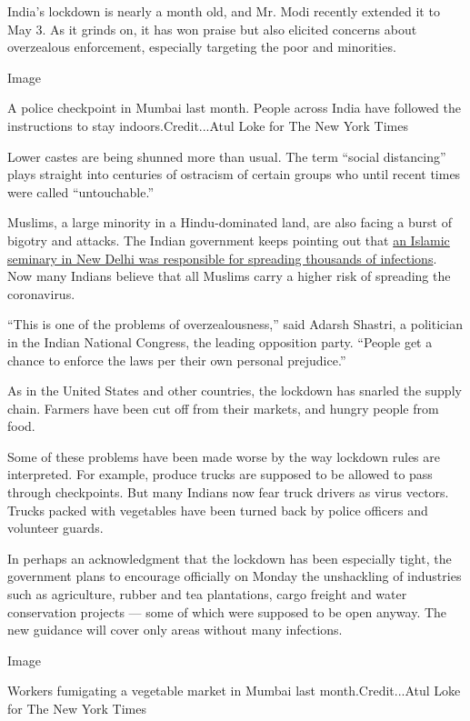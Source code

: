 India's lockdown is nearly a month old, and Mr. Modi recently extended
it to May 3. As it grinds on, it has won praise but also elicited
concerns about overzealous enforcement, especially targeting the poor
and minorities.

Image

A police checkpoint in Mumbai last month. People across India have
followed the instructions to stay indoors.Credit...Atul Loke for The New
York Times

Lower castes are being shunned more than usual. The term ``social
distancing'' plays straight into centuries of ostracism of certain
groups who until recent times were called ``untouchable.''

Muslims, a large minority in a Hindu-dominated land, are also facing a
burst of bigotry and attacks. The Indian government keeps pointing out
that
\href{https://www.nytimes.com/2020/04/12/world/asia/india-coronavirus-muslims-bigotry.html}{an
Islamic seminary in New Delhi was responsible for spreading thousands of
infections}. Now many Indians believe that all Muslims carry a higher
risk of spreading the coronavirus.

``This is one of the problems of overzealousness,'' said Adarsh Shastri,
a politician in the Indian National Congress, the leading opposition
party. ``People get a chance to enforce the laws per their own personal
prejudice.''

As in the United States and other countries, the lockdown has snarled
the supply chain. Farmers have been cut off from their markets, and
hungry people from food.

Some of these problems have been made worse by the way lockdown rules
are interpreted. For example, produce trucks are supposed to be allowed
to pass through checkpoints. But many Indians now fear truck drivers as
virus vectors. Trucks packed with vegetables have been turned back by
police officers and volunteer guards.

In perhaps an acknowledgment that the lockdown has been especially
tight, the government plans to encourage officially on Monday the
unshackling of industries such as agriculture, rubber and tea
plantations, cargo freight and water conservation projects --- some of
which were supposed to be open anyway. The new guidance will cover only
areas without many infections.

Image

Workers fumigating a vegetable market in Mumbai last month.Credit...Atul
Loke for The New York Times

